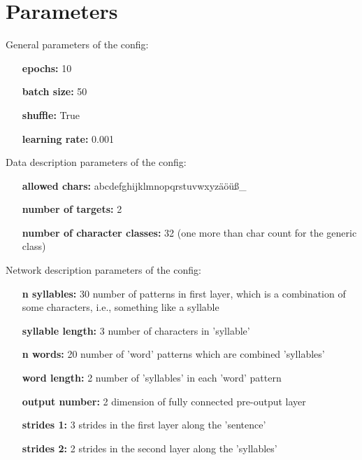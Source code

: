 \documentclass[a4paper,10pt,twoside]{article}
\begin{document}
 
\section{Parameters}

        General parameters of the config:
        

        \begin{itemize}
        \item[{\bf epochs:}] 10
        \item[{\bf batch size:}] 50
        \item[{\bf shuffle:}] True
        \item[{\bf learning rate:}] 0.001
        \end{itemize}
        

        
        Data description parameters of the config:
        

        \begin{itemize}
        \item[{\bf allowed chars:}] abcdefghijklmnopqrstuvwxyzäöüß_
        \item[{\bf number of targets:}] 2
        \item[{\bf number of character classes:}] 32 (one more than char count for the generic class)
        \end{itemize}
        

        
        Network description parameters of the config:
        

        \begin{itemize}
        \item[{\bf n syllables:}] 30 number of patterns in first layer, which is a combination of some characters, i.e., something like a syllable
        \item[{\bf syllable length:}] 3 number of characters in 'syllable'
        \item[{\bf n words:}] 20 number of 'word' patterns which are combined 'syllables'
        \item[{\bf word length:}] 2 number of 'syllables' in each 'word' pattern
        \item[{\bf output number:}] 2 dimension of fully connected pre-output layer
        \item[{\bf strides 1:}] 3 strides in the first layer along the 'sentence'
        \item[{\bf strides 2:}] 2 strides in the second layer along the 'syllables'
        \end{itemize}
        
\end{document}
